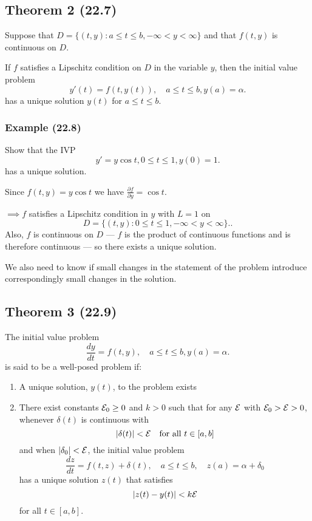 \subsection{Theorem 2 (22.7)}

Suppose that $D=\{(t,y): a\leq t \leq b, -\infty < y < \infty\}$ and that
$f(t,y)$ is continuous on $D$. 

If $f$ satisfies a Lipschitz condition on $D$ in the variable $y$, then the
initial value problem
\[
y'(t) = f(t, y(t)), \quad a \leq t \leq b, y(a) = \alpha
.\]
has a unique solution $y(t)$ for $a \leq t \leq b$.

\subsubsection{Example (22.8)}
\noindent
\Ex Show that the IVP 
\[
y' = y\cos t, 0 \leq t \leq 1, y(0) = 1
.\]
\noindent has a unique solution.

\soln Since $f(t,y) = y\cos t$ we have $\frac{\partial f}{\partial y} = \cos t$.

$\implies f$ satisfies a Lipschitz condition in $y$ with $L=1$ on 
\[
D = \{(t,y): 0 \leq t \leq 1, -\infty < y < \infty\}.
.\]
Also, $f$ is continuous on $D$ --- $f$ is the product of continuous functions and
is therefore continuous --- so there exists a unique solution.

We also need to know if small changes in the statement of the problem introduce
correspondingly small changes in the solution.

\subsection{Theorem 3 (22.9)}

\thm The initial value problem
\begin{equation*}
  \frac{dy}{dt} = f(t,y), \quad a \leq t \leq b, y(a) = \alpha
.\end{equation*}
is said to be a well-posed problem if:

\begin{enumerate}
  \item A unique solution, $y(t)$, to the problem exists
  \item There exist constants $\mathcal{E}_0 \geq 0$ and $k > 0$ such that for any $\mathcal{E}$ with $\mathcal{E}_0 > \mathcal{E} > 0$, whenever $\delta(t)$ is continuous with
    \[
      |\delta(t)| < \mathcal{E} \quad \text{for all } t \in [a, b]
    \]
    and when $|\delta_0| < \mathcal{E}$, the initial value problem
    \[
      \frac{dz}{dt} = f(t, z) + \delta(t), \quad a \leq t \leq b, \quad z(a) = \alpha + \delta_0
    \]
    has a unique solution $z(t)$ that satisfies
    \[
      |z(t) - y(t)| < k\mathcal{E}
    \]
    for all $t \in [a, b]$.
\end{enumerate}

